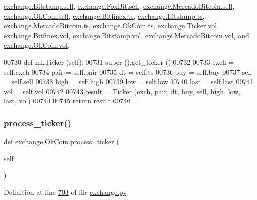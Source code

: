 \hyperlink{exchange_8py_source_l00503}{exchange.\+Bitstamp.\+sell}, \hyperlink{exchange_8py_source_l00575}{exchange.\+Fox\+Bit.\+sell}, \hyperlink{exchange_8py_source_l00643}{exchange.\+Mercado\+Bitcoin.\+sell}, \hyperlink{exchange_8py_source_l00708}{exchange.\+Ok\+Coin.\+sell}, \hyperlink{exchange_8py_source_l00428}{exchange.\+Bitfinex.\+ts}, \hyperlink{exchange_8py_source_l00501}{exchange.\+Bitstamp.\+ts}, \hyperlink{exchange_8py_source_l00641}{exchange.\+Mercado\+Bitcoin.\+ts}, \hyperlink{exchange_8py_source_l00706}{exchange.\+Ok\+Coin.\+ts}, \hyperlink{exchange_8py_source_l00065}{exchange.\+Ticker.\+vol}, \hyperlink{exchange_8py_source_l00435}{exchange.\+Bitfinex.\+vol}, \hyperlink{exchange_8py_source_l00507}{exchange.\+Bitstamp.\+vol}, \hyperlink{exchange_8py_source_l00647}{exchange.\+Mercado\+Bitcoin.\+vol}, and \hyperlink{exchange_8py_source_l00712}{exchange.\+Ok\+Coin.\+vol}.


\begin{DoxyCode}
00730     \textcolor{keyword}{def }mkTicker (self):
00731         super ().get\_ticker ()
00732         
00733         exch = self.exch
00734         pair = self.pair
00735         dt   = self.ts
00736         buy  = self.buy
00737         sell = self.sell
00738         high = self.high
00739         low  = self.low
00740         last = self.last
00741         vol  = self.vol
00742         
00743         result = Ticker (exch, pair, dt, buy, sell, high, low, last, vol)
00744         
00745         \textcolor{keywordflow}{return} result
00746         
\end{DoxyCode}
\mbox{\label{classexchange_1_1_ok_coin_ac3ae7a770ea55b1b52ff0d909182d387}} 
\subsubsection{\texorpdfstring{process\+\_\+ticker()}{process\_ticker()}}
{\footnotesize\ttfamily def exchange.\+Ok\+Coin.\+process\+\_\+ticker (\begin{DoxyParamCaption}\item[{}]{self }\end{DoxyParamCaption})}



Definition at line \hyperlink{exchange_8py_source_l00703}{703} of file \hyperlink{exchange_8py_source}{exchange.\+py}.


